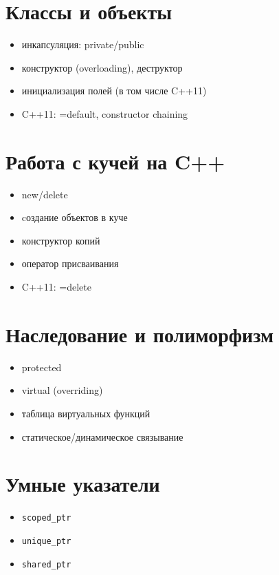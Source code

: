 \section{Классы и объекты}
\begin{itemize}[noitemsep]
    \item инкапсуляция: private/public
    \item конструктор (overloading), деструктор
    \item инициализация полей (в том числе C++11)
    \item C++11: =default, constructor chaining
\end{itemize}
\section{Работа с кучей на C++}
\begin{itemize}[noitemsep]
    \item new/delete
    \item cоздание объектов в куче
    \item конструктор копий
    \item оператор присваивания
    \item C++11: =delete
\end{itemize}
\section{Наследование и полиморфизм}
\begin{itemize}[noitemsep]
    \item protected
    \item virtual (overriding)
    \item таблица виртуальных функций
    \item статическое/динамическое связывание
\end{itemize}
\section{Умные указатели}
\begin{itemize}[noitemsep]
    \item \begin{verbatim}scoped_ptr \end{verbatim}
    \item \begin{verbatim}unique_ptr \end{verbatim}
    \item \begin{verbatim}shared_ptr \end{verbatim}
\end{itemize}
